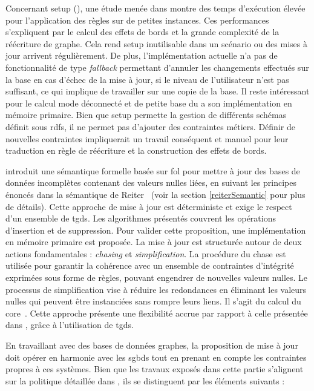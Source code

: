 Concernant \gls{setup} (\cite{chabinUsingGraphGrammar2019}), une étude menée dans \cite{chabinGraphRewritingSystem2020,chabinGraphRewritingRules2021} montre des temps d'exécution élevée pour l'application des règles sur de petites instances.
Ces performances s'expliquent par le calcul des effets de bords et la grande complexité de la réécriture de graphe.
Cela rend \gls{setup} inutilisable dans un scénario ou des mises à jour arrivent régulièrement.
De plus, l'implémentation actuelle n'a pas de fonctionnalité de type \emph{fallback} permettant d'annuler les changements effectués sur la base en cas d'échec de la mise à jour, si le niveau de l'utilisateur n'est pas suffisant, ce qui implique de travailler sur une copie de la base.
Il reste intéressant pour le calcul mode déconnecté et de petite base du a son implémentation en mémoire primaire.
Bien que \gls{setup} permette la gestion de différents schémas définit sous \gls{rdfs}, il ne permet pas d'ajouter des contraintes métiers.
Définir de nouvelles contraintes impliquerait un travail conséquent et manuel pour leur traduction en règle de réécriture et la construction des effets de bords.

\cite{chabinConsistentUpdatingDatabases2020} introduit une sémantique formelle basée sur \gls{fol} pour mettre à jour des bases de données incomplètes contenant des valeurs nulles liées, en suivant les principes énoncés dans la sémantique de Reiter~\cite{reiterSoundSometimesComplete1986} (voir la section \ref{reiterSemantic} pour plus de détails).
Cette approche de mise à jour est déterministe et exige le respect d'un ensemble de \glspl{tgd}.
Les algorithmes présentés couvrent les opérations d'insertion et de suppression.
Pour valider cette proposition, une implémentation en mémoire primaire est proposée.
La mise à jour est structurée autour de deux actions fondamentales : \emph{chasing} et \emph{simplification}.
La procédure du \gls{chase} est utilisée pour garantir la cohérence avec un ensemble de contraintes d'intégrité exprimées sous forme de règles, pouvant engendrer de nouvelles valeurs nulles.
Le processus de simplification vise à réduire les redondances en éliminant les valeurs nulles qui peuvent être instanciées sans rompre leurs liens.
Il s'agit du calcul du \gls{core}~\cite{faginDataExchangeGetting2005}.
Cette approche présente une flexibilité accrue par rapport à celle présentée dans \cite{chabinUsingGraphGrammar2019}, grâce à l'utilisation de \glspl{tgd}.

En travaillant avec des bases de données graphes, la proposition de mise à jour doit opérer en harmonie avec les \glspl{sgbd} tout en prenant en compte les contraintes propres à ces systèmes.
Bien que les travaux exposés dans cette partie s'alignent sur la politique détaillée dans \cite{chabinConsistentUpdatingDatabases2020}, ils se distinguent par les éléments suivants :


